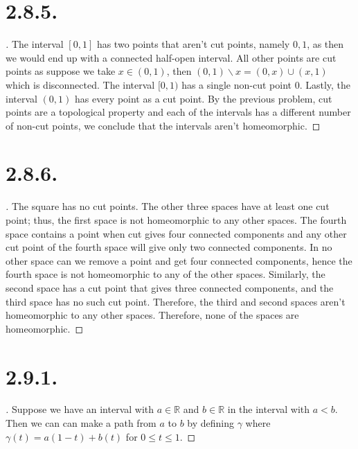 \documentclass{article}
\begin{document}
\section*{2.8.5.}
\begin{proof}[\unskip\nopunct]
    The interval $[0, 1]$ has two points that aren't cut points, namely $0, 1$, as then we would end up with a connected half-open interval. All other points are cut points as suppose we take $x \in (0, 1)$, then $(0, 1)\backslash x = (0, x) \cup (x, 1)$ which is disconnected. The interval $[0, 1)$ has a single non-cut point $0$. Lastly, the interval $(0, 1)$ has every point as a cut point. 
    By the previous problem, cut points are a topological property
    and each of the intervals has a different number of non-cut
    points, we conclude that the intervals aren't homeomorphic. 
    
\end{proof}
\section*{2.8.6.}
\begin{proof}[\unskip\nopunct]
    The square has no cut points. The other three spaces have at least one cut point; thus, the first space is not homeomorphic to any other spaces. The fourth space contains a point when cut gives four connected components and any other cut point of the fourth space will give only two connected components. 
    In no other space can we remove a point and get four connected components, hence 
    the fourth space is not homeomorphic to any of the other spaces.
    Similarly, the second space has a cut point that gives
    three connected components, and the third space has
    no such cut point. Therefore, the third and second spaces
    aren't homeomorphic to any other spaces. Therefore, none of the spaces are homeomorphic.  
    
\end{proof}
\section*{2.9.1.}
\begin{proof}[\unskip\nopunct]
   Suppose we have an interval with $a \in \mathbb{R}$ and $b \in \mathbb{R}$ in the interval with $a < b$. 
   Then we can can make a path from $a$ to $b$ by defining $\gamma$
   where $\gamma(t) = a(1 - t) + b(t)$ for $0 \leq t \leq 1$. 
   
\end{proof}
\end{document}
